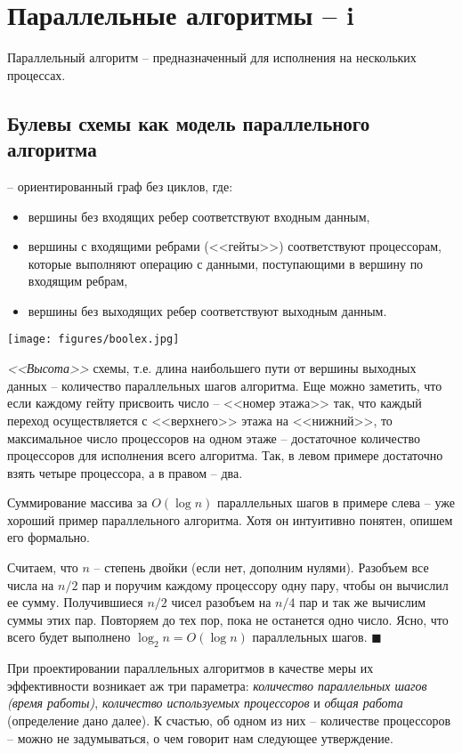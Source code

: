 \section{Параллельные алгоритмы -- i}
Параллельный алгоритм -- предназначенный для исполнения на нескольких процессах. 
\subsection{Булевы схемы как модель параллельного алгоритма}
 -- ориентированный граф без циклов, где: 
\begin{itemize}
    \item вершины без входящих ребер соответствуют входным данным,
    \item вершины с входящими ребрами (<<гейты>>) соответствуют процессорам, которые выполняют операцию с данными, поступающими в вершину по входящим ребрам,
    \item вершины без выходящих ребер соответствуют выходным данным.
\end{itemize}
\texttt{[image: figures/boolex.jpg]}
 
\textit{<<Высота>>} схемы, т.е. длина наибольшего пути от вершины выходных данных -- количество параллельных шагов алгоритма. Еще можно заметить, что если каждому гейту присвоить число -- <<номер этажа>> так, что каждый переход осуществляется с <<верхнего>> этажа на <<нижний>>, то максимальное число процессоров на одном этаже -- достаточное количество процессоров для исполнения всего алгоритма. Так, в левом примере достаточно взять четыре процессора, а в правом -- два. 

Суммирование массива за $O(\log n)$ параллельных шагов в примере слева -- уже хороший пример параллельного алгоритма. Хотя он интуитивно понятен, опишем его формально. 


 Считаем, что $n$ -- степень двойки (если нет, дополним нулями).  Разобъем все числа на $n/2$ пар и поручим каждому процессору одну пару, чтобы он вычислил ее сумму. Получившиеся $n/2$ чисел разобъем на $n/4$ пар и так же вычислим суммы этих пар. Повторяем до тех пор, пока не останется одно число. Ясно, что всего будет выполнено $\log_2 n = O(\log n)$ параллельных шагов. $\blacksquare$

При проектировании параллельных алгоритмов в качестве меры их эффективности возникает аж три параметра: \textit{количество параллельных шагов (время работы)}, \textit{количество используемых процессоров} и \textit{общая работа} (определение дано далее). К счастью, об одном из них -- количестве процессоров -- можно не задумываться, о чем говорит нам следующее утверждение.

